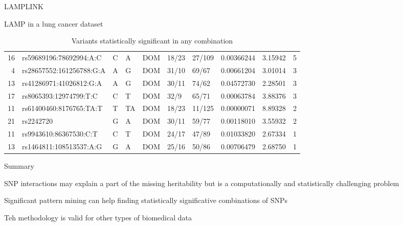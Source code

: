 \documentclass[ignorenonframetext,]{beamer}
\begin{document}
\begin{frame}{LAMPLINK}
\begin{block}{LAMP in a lung cancer dataset}
\begin{table}[ht]
{\begin{tabular}{rllllllrrr}
  16 & rs59689196:78692994:A:C & C & A & DOM & 18/23 & 27/109 & 0.00366244 & 3.15942 & 5 \\ 
  4 & rs28657552:161256788:G:A & A & G & DOM & 31/10 & 69/67 & 0.00661204 & 3.01014 & 3 \\ 
  13 & rs41286971:41026812:G:A & A & G & DOM & 30/11 & 74/62 & 0.04572730 & 2.28501 & 3 \\ 
  17 & rs8065393:12974799:T:C & C & T & DOM & 32/9 & 65/71 & 0.00063784 & 3.88376 & 3 \\ 
  11 & rs61400460:8176765:TA:T & T & TA & DOM & 18/23 & 11/125 & 0.00000071 & 8.89328 & 2 \\ 
  21 & rs2242720 & G & A & DOM & 30/11 & 59/77 & 0.00118010 & 3.55932 & 2 \\ 
  11 & rs9943610:86367530:C:T & C & T & DOM & 24/17 & 47/89 & 0.01033820 & 2.67334 & 1 \\ 
  13 & rs1464811:108513537:A:G & G & A & DOM & 25/16 & 50/86 & 0.00706479 & 2.68750 & 1 \\ 
   \hline
\end{tabular}
}
\caption{Variants statistically significant in any combination} 
\end{table}

\end{block}

\end{frame}

\begin{frame}{Summary}

SNP interactions may explain a part of the missing heritability but is a
computationally and statistically challenging problem

Significant pattern mining can help finding statistically significative
combinations of SNPs

Teh methodology is valid for other types of biomedical data

\end{frame}
\end{document}
